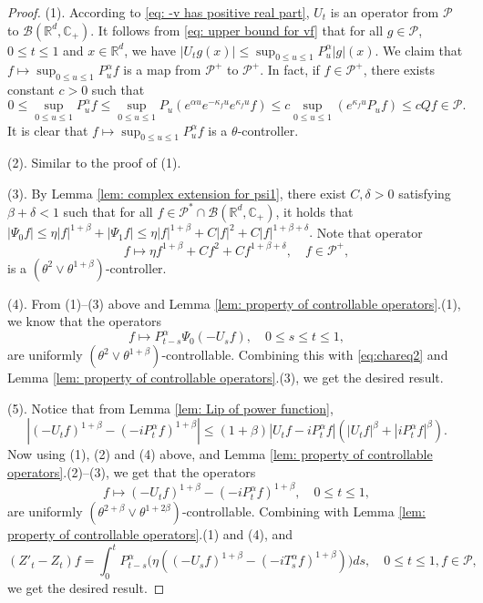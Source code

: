 \documentclass[12pt,a4paper]{amsart}
\theoremstyle{plain}
\theoremstyle{definition}
\numberwithin{equation}{section}
\begin{document}
\begin{proof}
  (1). According to \eqref{eq: -v has positive real part}, $U_t$ is an operator from $\mathcal P$ to $\mathcal B(\mathbb R^d, \mathbb C_+)$.
  It follows from \eqref{eq: upper bound for vf} that for all $g\in \mathcal P$, $0\leq t\leq 1$ and $x\in \mathbb R^d$, we have
  \(
    |U_t g(x)|
    \leq \sup_{0\leq u\leq 1}P_u^\alpha |g| (x).
  \)
  We claim that $f\mapsto\sup_{0\leq u\leq 1}P^{\alpha}_u f$ is a map from $\mathcal P^+$ to $\mathcal P^+$. In fact, if $f\in \mathcal P^+$, there exists constant $c>0$ such that
  \[
    0
    \leq \sup_{0\leq u\leq 1}P^{\alpha}_u f
    \leq \sup_{0\leq u\leq 1} P_u (e^{\alpha u} e^{-\kappa_f u} e^{\kappa_f u} f )
    \leq c \sup_{0\leq u\leq 1} (e^{\kappa_fu}P_u f) \leq c Qf \in \mathcal P.
  \]
	It is clear that $f\mapsto\sup_{0\leq u\leq 1}P^{\alpha}_u f$ is a $\theta$-controller.

  (2). Similar to the proof of (1).

  (3). By Lemma \ref{lem: complex extension for psi1}, there exist $C, \delta >0$ satisfying $\beta+\delta< 1$ such that for all $ f \in \mathcal P^* \cap \mathcal B( \mathbb R^d, \mathbb C_+ )$, it holds that
\(
|\Psi_0 f|
      \leq \eta |f|^{1+\beta} + |\Psi_1 f|
      \leq \eta |f|^{1+\beta} + C|f|^2+ C |f|^{1+\beta + \delta}.
\)
  Note that operator
  \[
    f \mapsto \eta f^{1+\beta} + Cf^2+ Cf^{1+\beta + \delta}
    , \quad f\in \mathcal P^+,
  \]
  is a $(\theta^2 \vee \theta^{1+\beta})$-controller.

  (4).
  From (1)--(3) above and Lemma \ref{lem: property of controllable operators}.(1), we know that the operators
  \[
    f \mapsto P^\alpha_{t-s}\Psi_0(-U_sf)
    , \quad 0\leq s\leq t\leq 1,
  \]
  are uniformly $(\theta^2\vee \theta^{1+\beta})$-controllable.
  Combining this with \eqref{eq:chareq2} and
Lemma \ref{lem: property of controllable operators}.(3), we get the desired result.

  (5). Notice that from Lemma \ref{lem: Lip of power function},
  \[
    |(-U_t f)^{1+\beta} - (-iP^\alpha_t f)^{1+\beta} |
    \leq  (1+\beta) |U_t f-iP^\alpha_t f|(|U_t f|^{\beta}+|i P^\alpha_t f|^{\beta}).
  \]
  Now using (1), (2) and  (4) above, and Lemma \ref{lem: property of controllable operators}.(2)--(3), we get that the operators
  \[
    f \mapsto (-U_t f)^{1+\beta} - (-iP^\alpha_t f)^{1+\beta},\quad 0\leq t\leq 1,
  \]
  are uniformly $(\theta^{2+\beta}\vee \theta^{1+2\beta})$-controllable.
  Combining with Lemma \ref{lem: property of controllable operators}.(1) and (4), and
  \begin{equation}
    (Z'_t - Z_t)f
    = \int_0^t P^\alpha_{t-s}\Big( \eta ((-U_s f)^{1+\beta} - (-iT_s^\alpha f)^{1+\beta} )\Big)ds
    , \quad 0\leq t\leq 1, f\in \mathcal P,
  \end{equation}
  we get the desired result.


\end{proof}
\end{document}
